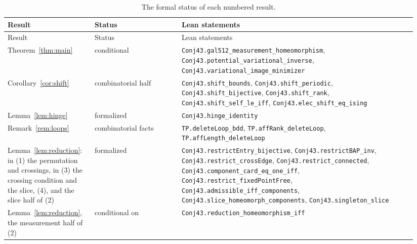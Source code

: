 \documentclass[11pt]{article}
\theoremstyle{definition}
\begin{document}
\begin{longtable}{@{}>{\raggedright\arraybackslash}p{0.2\linewidth}>{\raggedright\arraybackslash}p{0.2\linewidth}>{\raggedright\arraybackslash}p{0.54\linewidth}@{}}
\caption{The formal status of each numbered result.}\label{tab:formal-map}\\
\hline Result & Status & Lean statements \\ \hline
\endfirsthead
\hline Result & Status & Lean statements \\ \hline
\endhead
Theorem~\ref{thm:main} & conditional & \texttt{Conj43.\allowbreak gal512\_\allowbreak measurement\_\allowbreak homeomorphism}, \texttt{Conj43.\allowbreak potential\_\allowbreak variational\_\allowbreak inverse}, \texttt{Conj43.\allowbreak variational\_\allowbreak image\_\allowbreak minimizer} \\
Corollary~\ref{cor:shift} & combinatorial half & \texttt{Conj43.\allowbreak shift\_\allowbreak bounds}, \texttt{Conj43.\allowbreak shift\_\allowbreak periodic}, \texttt{Conj43.\allowbreak shift\_\allowbreak bijective}, \texttt{Conj43.\allowbreak shift\_\allowbreak rank}, \texttt{Conj43.\allowbreak shift\_\allowbreak self\_\allowbreak le\_\allowbreak iff}, \texttt{Conj43.\allowbreak elec\_\allowbreak shift\_\allowbreak eq\_\allowbreak ising} \\
Lemma~\ref{lem:hinge} & formalized & \texttt{Conj43.\allowbreak hinge\_\allowbreak identity} \\
Remark~\ref{rem:loops} & combinatorial facts & \texttt{TP.\allowbreak deleteLoop\_\allowbreak bdd}, \texttt{TP.\allowbreak affRank\_\allowbreak deleteLoop}, \texttt{TP.\allowbreak affLength\_\allowbreak deleteLoop} \\
Lemma~\ref{lem:reduction}: in (1) the permutation and crossings, in (3) the crossing condition and the slice, (4), and the slice half of (2) & formalized & \texttt{Conj43.\allowbreak restrictEntry\_\allowbreak bijective}, \texttt{Conj43.\allowbreak restrictBAP\_\allowbreak inv}, \texttt{Conj43.\allowbreak restrict\_\allowbreak crossEdge}, \texttt{Conj43.\allowbreak restrict\_\allowbreak connected}, \texttt{Conj43.\allowbreak component\_\allowbreak card\_\allowbreak eq\_\allowbreak one\_\allowbreak iff}, \texttt{Conj43.\allowbreak restrict\_\allowbreak fixedPointFree}, \texttt{Conj43.\allowbreak admissible\_\allowbreak iff\_\allowbreak components}, \texttt{Conj43.\allowbreak slice\_\allowbreak homeomorph\_\allowbreak components}, \texttt{Conj43.\allowbreak singleton\_\allowbreak slice} \\
Lemma~\ref{lem:reduction}, the measurement half of (2) & conditional on \cite[Prop.~4.10]{Galashin} & \texttt{Conj43.\allowbreak reduction\_\allowbreak homeomorphism\_\allowbreak iff} \\

\end{longtable}
\end{document}
